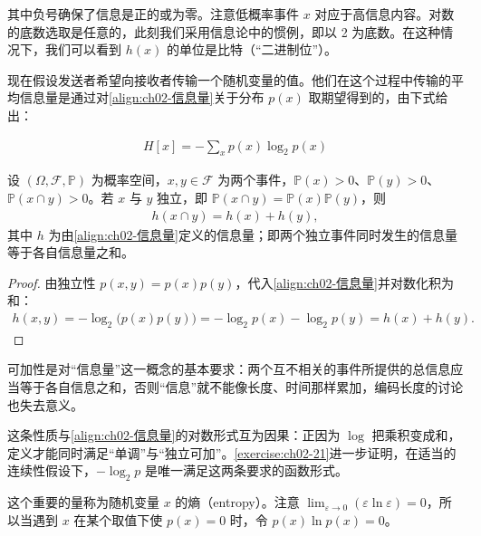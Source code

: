 \documentclass[../../main.tex]{subfiles}
\begin{document}
其中负号确保了信息是正的或为零。注意低概率事件 $x$ 对应于高信息内容。对数的底数选取是任意的，此刻我们采用信息论中的惯例，即以 2 为底数。在这种情况下，我们可以看到 $h(x)$ 的单位是比特（“二进制位”）。

现在假设发送者希望向接收者传输一个随机变量的值。他们在这个过程中传输的平均信息量是通过对\eqref{align:ch02-信息量}关于分布 $p(x)$ 取期望得到的，由下式给出：

\begin{align}
  H[x] = -\sum_{x} p(x)\log_2 p(x)
  \label{align:ch02-离散熵}
\end{align}

\begin{proposition}[独立事件的信息量可加]\label{proposition:ch02-信息量可加}
设 $(\Omega,\mathcal{F},\mathbb{P})$ 为概率空间，$x,y\in\mathcal{F}$ 为两个事件，$\mathbb{P}(x)>0$、$\mathbb{P}(y)>0$、$\mathbb{P}(x\cap y)>0$。若 $x$ 与 $y$ 独立，即 $\mathbb{P}(x\cap y)=\mathbb{P}(x)\mathbb{P}(y)$，则
\begin{align*}
  h(x\cap y)=h(x)+h(y),
\end{align*}
其中 $h$ 为由\eqref{align:ch02-信息量}定义的信息量；即两个独立事件同时发生的信息量等于各自信息量之和。
\end{proposition}

\begin{proof}
由独立性 $p(x,y)=p(x)p(y)$，代入\eqref{align:ch02-信息量}并对数化积为和：
\begin{align*}
  h(x,y) = -\log_2\big(p(x)p(y)\big) = -\log_2p(x) - \log_2p(y) = h(x)+h(y) .
\end{align*}
\end{proof}

\begin{remark}
可加性是对“信息量”这一概念的基本要求：两个互不相关的事件所提供的总信息应当等于各自信息之和，否则“信息”就不能像长度、时间那样累加，编码长度的讨论也失去意义。

这条性质与\eqref{align:ch02-信息量}的对数形式互为因果：正因为 $\log$ 把乘积变成和，定义才能同时满足“单调”与“独立可加”。\cref{exercise:ch02-21}进一步证明，在适当的连续性假设下，$-\log_2p$ 是唯一满足这两条要求的函数形式。
\end{remark}

这个重要的量称为随机变量 $x$ 的熵（entropy）。注意 $\lim_{\varepsilon\to0}(\varepsilon\ln\varepsilon)=0$，所以当遇到 $x$ 在某个取值下使 $p(x)=0$ 时，令 $p(x)\ln p(x)=0$。
\end{document}
